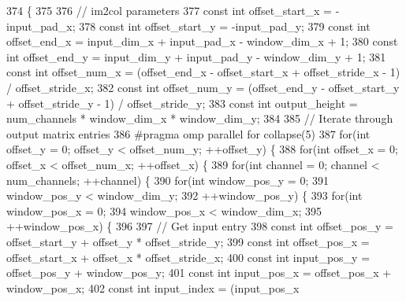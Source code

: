 \begin{DoxyCode}
374                                           \{
375 
376   \textcolor{comment}{// im2col parameters}
377   \textcolor{keyword}{const} \textcolor{keywordtype}{int} offset\_start\_x = -input\_pad\_x;
378   \textcolor{keyword}{const} \textcolor{keywordtype}{int} offset\_start\_y = -input\_pad\_y;
379   \textcolor{keyword}{const} \textcolor{keywordtype}{int} offset\_end\_x = input\_dim\_x + input\_pad\_x - window\_dim\_x + 1;
380   \textcolor{keyword}{const} \textcolor{keywordtype}{int} offset\_end\_y = input\_dim\_y + input\_pad\_y - window\_dim\_y + 1;
381   \textcolor{keyword}{const} \textcolor{keywordtype}{int} offset\_num\_x = (offset\_end\_x - offset\_start\_x + offset\_stride\_x - 1) / offset\_stride\_x;
382   \textcolor{keyword}{const} \textcolor{keywordtype}{int} offset\_num\_y = (offset\_end\_y - offset\_start\_y + offset\_stride\_y - 1) / offset\_stride\_y;
383   \textcolor{keyword}{const} \textcolor{keywordtype}{int} output\_height = num\_channels * window\_dim\_x * window\_dim\_y;
384 
385   \textcolor{comment}{// Iterate through output matrix entries}
386 \textcolor{preprocessor}{  #pragma omp parallel for collapse(5)}
387   \textcolor{keywordflow}{for}(\textcolor{keywordtype}{int} offset\_y = 0; offset\_y < offset\_num\_y; ++offset\_y) \{
388     \textcolor{keywordflow}{for}(\textcolor{keywordtype}{int} offset\_x = 0; offset\_x < offset\_num\_x; ++offset\_x) \{
389       \textcolor{keywordflow}{for}(\textcolor{keywordtype}{int} channel = 0; channel < num\_channels; ++channel) \{
390         \textcolor{keywordflow}{for}(\textcolor{keywordtype}{int} window\_pos\_y = 0;
391             window\_pos\_y < window\_dim\_y;
392             ++window\_pos\_y) \{
393           \textcolor{keywordflow}{for}(\textcolor{keywordtype}{int} window\_pos\_x = 0;
394               window\_pos\_x < window\_dim\_x;
395               ++window\_pos\_x) \{
396 
397             \textcolor{comment}{// Get input entry}
398             \textcolor{keyword}{const} \textcolor{keywordtype}{int} offset\_pos\_y = offset\_start\_y + offset\_y * offset\_stride\_y;
399             \textcolor{keyword}{const} \textcolor{keywordtype}{int} offset\_pos\_x = offset\_start\_x + offset\_x * offset\_stride\_x;
400             \textcolor{keyword}{const} \textcolor{keywordtype}{int} input\_pos\_y = offset\_pos\_y + window\_pos\_y;
401             \textcolor{keyword}{const} \textcolor{keywordtype}{int} input\_pos\_x = offset\_pos\_x + window\_pos\_x;
402             \textcolor{keyword}{const} \textcolor{keywordtype}{int} input\_index = (input\_pos\_x

\end{DoxyCode}
